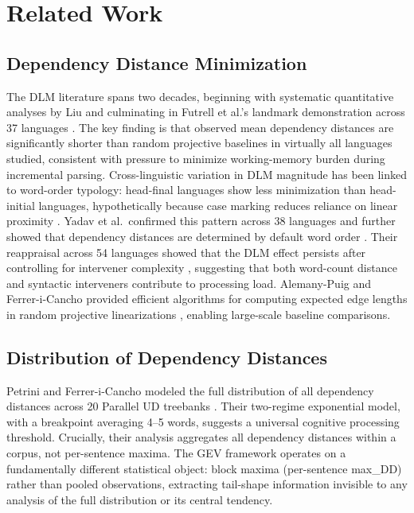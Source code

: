 \documentclass[11pt,letterpaper]{article}
\begin{document}
\section{Related Work}\label{sec:related}

\subsection{Dependency Distance Minimization}

The DLM literature spans two decades, beginning with systematic quantitative analyses by Liu \cite{Liu2017, Liu2010} and culminating in Futrell et al.'s landmark demonstration across 37 languages \cite{Futrell2015}. The key finding is that observed mean dependency distances are significantly shorter than random projective baselines in virtually all languages studied, consistent with pressure to minimize working-memory burden during incremental parsing. Cross-linguistic variation in DLM magnitude has been linked to word-order typology: head-final languages show less minimization than head-initial languages, hypothetically because case marking reduces reliance on linear proximity \cite{Futrell2015}. Yadav et al.\ confirmed this pattern across 38 languages and further showed that dependency distances are determined by default word order \cite{Yadav2020}. Their reappraisal across 54 languages showed that the DLM effect persists after controlling for intervener complexity \cite{Yadav2022}, suggesting that both word-count distance and syntactic interveners contribute to processing load. Alemany-Puig and Ferrer-i-Cancho provided efficient algorithms for computing expected edge lengths in random projective linearizations \cite{AlemanyPuig2022}, enabling large-scale baseline comparisons.

\subsection{Distribution of Dependency Distances}

Petrini and Ferrer-i-Cancho modeled the full distribution of all dependency distances across 20 Parallel UD treebanks \cite{Petrini2025}. Their two-regime exponential model, with a breakpoint averaging 4--5 words, suggests a universal cognitive processing threshold. Crucially, their analysis aggregates all dependency distances within a corpus, not per-sentence maxima. The GEV framework operates on a fundamentally different statistical object: block maxima (per-sentence max\_DD) rather than pooled observations, extracting tail-shape information invisible to any analysis of the full distribution or its central tendency.
\end{document}

